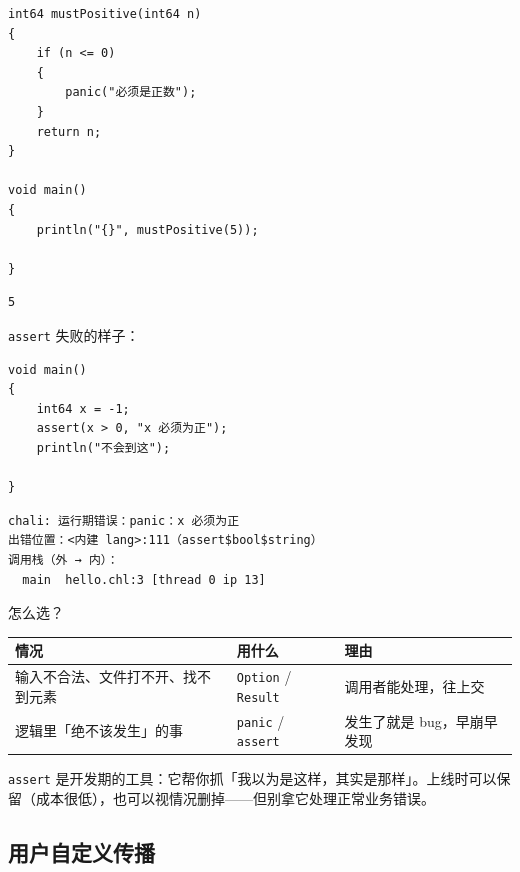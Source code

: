 \par
\medskip
\begin{lstlisting}[style=chali]
int64 mustPositive(int64 n)
{
    if (n <= 0)
    {
        panic("必须是正数");
    }
    return n;
}

void main()
{
    println("{}", mustPositive(5));

}
\end{lstlisting}
\par
\medskip

\par
\medskip
\begin{lstlisting}[style=out]
5
\end{lstlisting}
\par
\medskip

\texttt{assert} 失败的样子：

\par
\medskip
\begin{lstlisting}[style=chali]
void main()
{
    int64 x = -1;
    assert(x > 0, "x 必须为正");
    println("不会到这");

}
\end{lstlisting}
\par
\medskip

\par
\medskip
\begin{lstlisting}[style=out]
chali: 运行期错误：panic：x 必须为正
出错位置：<内建 lang>:111（assert$bool$string）
调用栈（外 → 内）：
  main  hello.chl:3 [thread 0 ip 13]
\end{lstlisting}
\par
\medskip

怎么选？

\begin{center}
\begin{tabular}{lll}
\toprule
情况 & 用什么 & 理由 \\
\midrule
输入不合法、文件打不开、找不到元素 & \texttt{Option} / \texttt{Result} & 调用者能处理，往上交 \\
逻辑里「绝不该发生」的事 & \texttt{panic} / \texttt{assert} & 发生了就是 bug，早崩早发现 \\
\bottomrule
\end{tabular}
\end{center}

\texttt{assert} 是开发期的工具：它帮你抓「我以为是这样，其实是那样」。上线时可以保留（成本很低），也可以视情况删掉——但别拿它处理正常业务错误。

\subsection*{用户自定义传播}

